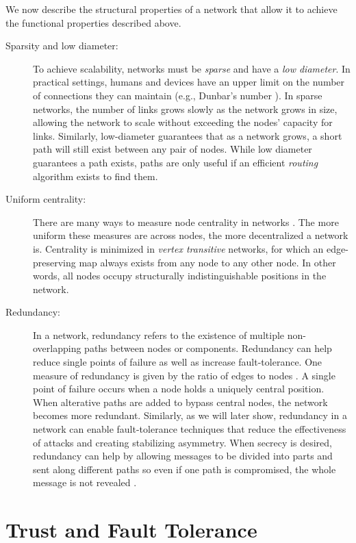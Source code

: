 \documentclass{sig-alternate-05-2015}
\begin{document}
We now describe the structural properties of a network that allow it to achieve the functional properties described above. 
\begin{description}
\item [Sparsity and low diameter:]
To achieve scalability, networks must be {\em sparse} and have a
{\em low diameter}.
In practical settings, humans and devices have an upper limit on the number
of connections they can maintain (e.g., Dunbar's number
\cite{dunbar_neocortex_1992}).
In sparse networks, the number of links grows slowly as the network grows in
size, allowing the network to scale without exceeding the nodes' capacity for
links.
Similarly, low-diameter guarantees that as a network grows, a short path will
still exist between any pair of nodes.
While low diameter guarantees a path exists,
paths are only useful if an efficient {\em routing} algorithm exists
to find them.

\item [Uniform centrality:]
There are many ways to measure node centrality in networks
\cite{freeman_centrality_1978}.
The more uniform these measures are across nodes, the more decentralized
a network is.
Centrality is minimized in {\em vertex transitive} networks,
for which an edge-preserving map
always exists from any node to any other node.
In other words, all nodes occupy structurally indistinguishable positions
in the network.

\item [Redundancy:]
In a network, redundancy refers to the existence of multiple non-overlapping
paths between nodes or components.
Redundancy can help reduce single points of failure as well as
increase fault-tolerance.
One measure of redundancy is given by the ratio of edges to nodes
\cite{baran_distributed_1964}.
A single point of failure occurs when a node holds a uniquely
central position.
When alterative paths are added to bypass central nodes,
the network becomes more redundant.
Similarly, as we will later show,
redundancy in a network can enable fault-tolerance techniques
that reduce the effectiveness of attacks and creating stabilizing asymmetry.
When secrecy is desired, redundancy can help by allowing messages to be
divided into parts and sent along different paths so even if one path is
compromised, the whole message is not revealed
\cite{shamir_how_1979, blakley_safeguarding_1979}. 

\end{description}

\section{Trust and Fault Tolerance}
\end{document}
